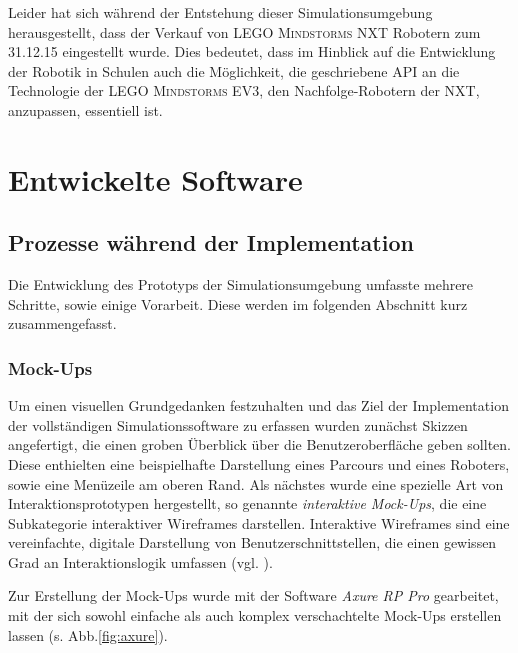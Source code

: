 \documentclass[paper=a4, DIV=calc, BCOR=12mm, twoside=on, onecolumn=on, open = right, titlepage =on, parskip =half-, headsepline = on, footsepline = off, chapterprefix = off, appendixprefix = on, fontsize = 12pt, numbers = noenddot, abstract = on]{scrbook}
\begin{document}
Leider hat sich während der Entstehung dieser Simulationsumgebung herausgestellt, dass der Verkauf von \textsc{LEGO Mindstorms} NXT Robotern zum 31.12.15 eingestellt wurde. Dies bedeutet, dass im Hinblick auf die Entwicklung der Robotik in Schulen auch die Möglichkeit, die geschriebene API an die Technologie der \textsc{LEGO Mindstorms} EV3, den Nachfolge-Robotern der NXT, anzupassen, essentiell ist.


\par \singlespacing
\chapter{Entwickelte Software}
\onehalfspacing
\par \singlespacing
\section{Prozesse während der Implementation}
\onehalfspacing
Die Entwicklung des Prototyps der Simulationsumgebung umfasste mehrere Schritte, sowie einige Vorarbeit. Diese werden im folgenden Abschnitt kurz zusammengefasst.
\par \singlespacing
\subsection{Mock-Ups} 
\onehalfspacing
Um einen visuellen Grundgedanken festzuhalten und das Ziel der Implementation der vollständigen Simulationssoftware zu erfassen wurden zunächst Skizzen angefertigt, die einen groben Überblick über die Benutzeroberfläche geben sollten. Diese enthielten eine beispielhafte Darstellung eines Parcours und eines Roboters, sowie eine Menüzeile am oberen Rand. Als nächstes wurde eine spezielle Art von Interaktionsprototypen hergestellt, so genannte \emph{interaktive Mock-Ups}, die eine Subkategorie interaktiver Wireframes darstellen. Interaktive Wireframes sind eine vereinfachte, digitale Darstellung von Benutzerschnittstellen, die einen gewissen Grad an Interaktionslogik umfassen (vgl. \cite[S.162ff.]{moser:12}).

Zur Erstellung der Mock-Ups wurde mit der Software \emph{Axure RP Pro} gearbeitet, mit der sich sowohl einfache als auch komplex verschachtelte Mock-Ups erstellen lassen (s. Abb.\ref{fig:axure}).
\end{document}
